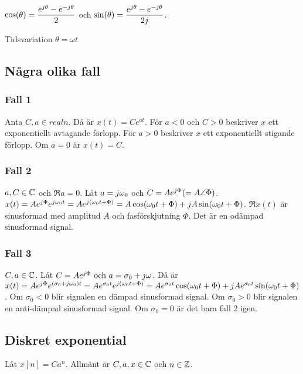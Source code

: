 \documentclass[a4paper]{article}
\begin{document}
\(
    \cos(\theta) = \displaystyle\frac{e^{j\theta} - e^{-j\theta}}{2} 
\) och \(
    \sin(\theta) = \displaystyle\frac{e^{j\theta} - e^{-j\theta}}{2j} 
\).

Tidsvariation \(
    \theta = \omega t
\) 

\subsection{Några olika fall}
\subsubsection{Fall 1}
Anta \(
    C, a \in realn
\). Då är \(
    x(t) = Ce^{at}
\). För \(
    a < 0 \text{ och } C > 0 
\) beskriver \(
    x
\) ett exponentiellt avtagande förlopp.
För \(
    a > 0 
\) beskriver \(
    x
\) ett exponentiellt stigande förlopp.
Om \(
    a = 0
\) är \(
    x(t) = C
\).

\subsubsection{Fall 2}
\(
    a, C \in \mathbb{C}
\) och \(
    \Re{a} = 0
\). Låt \(
    a = j\omega_0
\) och \(
    C = A e^{j\Phi} (= A \angle \Phi)
\). \(
    x(t) = A e^{j\Phi} e^{j\omega_0t} = Ae^{j(\omega_0t+\Phi)} 
    = A \cos(\omega_0t+\Phi) + j A \sin(\omega_0t+\Phi)
\). \(
    \Re{x(t)} 
\) är sinusformad med amplitud \(
    A
\) och fasförskjutning \(
    \Phi
\). Det är en odämpad sinusformad signal.

\subsubsection{Fall 3}
\(
    C, a \in \mathbb{C}
\). Låt \(
    C = Ae^{j\Phi} \text{ och } a = \sigma_0 + j\omega
\). Då är \(
    x(t) = Ae^{j\Phi} e^{(\sigma_0+j\omega_0)t} 
    = Ae^{\sigma_0t}e^{j(\omega_0t+\Phi)}
    = A e^{\sigma_0t}\cos(\omega_0t+\Phi) + j Ae^{\sigma_0t}\sin(\omega_0t+\Phi)
\). Om \(
    \sigma_0 < 0 
\) blir signalen en dämpad sinusformad signal. Om \(
    \sigma_0 > 0
\) blir signalen en anti-dämpad sinusformad signal. Om \(
    \sigma_0 = 0
\) är det bara fall 2 igen.

\subsection{Diskret exponential}
Låt \(
    x[n] = C a^n
\). Allmänt är \(
    C, a, x \in \mathbb{C}
\) och \(
    n \in \mathbb{Z}
\).
\end{document}
